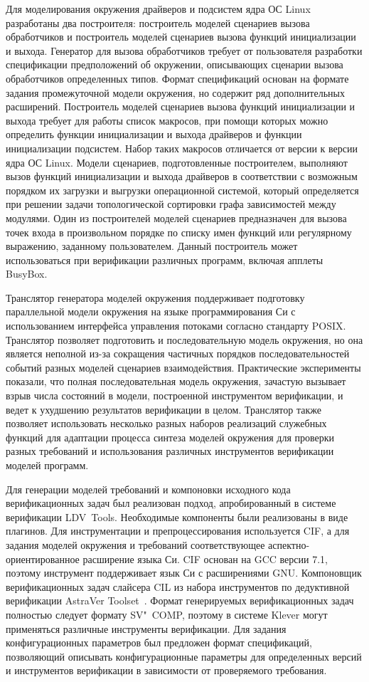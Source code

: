 Для моделирования окружения драйверов и подсистем ядра ОС Linux разработаны два построителя: построитель моделей сценариев вызова обработчиков и построитель моделей сценариев вызова функций инициализации и выхода.
Генератор для вызова обработчиков требует от пользователя разработки спецификации предположений об окружении, описывающих сценарии вызова обработчиков определенных типов.
Формат спецификаций основан на формате задания промежуточной модели окружения, но содержит ряд дополнительных расширений.
Построитель моделей сценариев вызова функций инициализации и выхода требует для работы список макросов, при помощи которых можно определить функции инициализации и выхода драйверов и функции инициализации подсистем.
Набор таких макросов отличается от версии к версии ядра ОС Linux.
Модели сценариев, подготовленные построителем, выполняют вызов функций инициализации и выхода драйверов в соответствии с возможным порядком их загрузки и выгрузки операционной системой, который определяется при решении задачи топологической сортировки графа зависимостей между модулями.
Один из построителей моделей сценариев предназначен для вызова точек входа в произвольном порядке по списку имен функций или регулярному выражению, заданному пользователем.
Данный построитель может использоваться при верификации различных программ, включая апплеты BusyBox.

Транслятор генератора моделей окружения поддерживает подготовку параллельной модели окружения на языке программирования Си с использованием интерфейса управления потоками согласно стандарту POSIX.
Транслятор позволяет подготовить и последовательную модель окружения, но она является неполной из-за сокращения частичных порядков последовательностей событий разных моделей сценариев взаимодействия.
Практические эксперименты показали, что полная последовательная модель окружения, зачастую вызывает взрыв числа состояний в модели, построенной инструментом верификации, и ведет к ухудшению результатов верификации в целом.
Транслятор также позволяет использовать несколько разных наборов реализаций служебных функций для адаптации процесса синтеза моделей окружения для проверки разных требований и использования различных инструментов верификации моделей программ.

Для генерации моделей требований и компоновки исходного кода верификационных задач был реализован подход, апробированный в системе верификации LDV~Tools.
Необходимые компоненты были реализованы в виде плагинов.
Для инструментации и препроцессирования используется CIF, а для задания моделей окружения и требований соответствующее аспектно-ориентированное расширение языка Си.
CIF основан на GCC версии 7.1, поэтому инструмент поддерживает язык Си с расширениями GNU.
Компоновщик верификационных задач слайсера CIL из набора инструментов по дедуктивной верификации AstraVer Toolset~\cite{CILAstra}.
Формат генерируемых верификационных задач полностью следует формату SV"~COMP, поэтому в системе Klever могут применяться различные инструменты верификации.
Для задания конфигурационных параметров был предложен формат спецификаций, позволяющий описывать конфигурационные параметры для определенных версий и инструментов верификации в зависимости от проверяемого требования.

